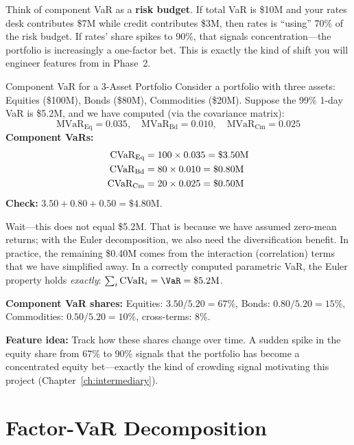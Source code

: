 \begin{intuition}
Think of component VaR as a \textbf{risk budget}.  If total VaR is
\$10M and your rates desk contributes \$7M while credit contributes
\$3M, then rates is ``using'' 70\% of the risk budget.  If rates' share
spikes to 90\%, that signals concentration---the portfolio is
increasingly a one-factor bet.  This is exactly the kind of shift you
will engineer features from in Phase~2.
\end{intuition}

\begin{workedexample}{Component VaR for a 3-Asset Portfolio}
Consider a portfolio with three assets: Equities (\$100M), Bonds
(\$80M), Commodities (\$20M).  Suppose the 99\% 1-day VaR is \$5.2M,
and we have computed (via the covariance matrix):
\[
  \text{MVaR}_{\text{Eq}} = 0.035, \quad
  \text{MVaR}_{\text{Bd}} = 0.010, \quad
  \text{MVaR}_{\text{Cm}} = 0.025
\]
\textbf{Component VaRs:}
\begin{align}
  \text{CVaR}_{\text{Eq}} &= 100 \times 0.035 = \$3.50\text{M} \notag \\
  \text{CVaR}_{\text{Bd}} &= 80  \times 0.010 = \$0.80\text{M} \notag \\
  \text{CVaR}_{\text{Cm}} &= 20  \times 0.025 = \$0.50\text{M} \notag
\end{align}
\textbf{Check:} $3.50 + 0.80 + 0.50 = \$4.80\text{M}$.

Wait---this does not equal \$5.2M.  That is because we have assumed
zero-mean returns; with the Euler decomposition, we also need the
diversification benefit.  In practice, the remaining \$0.40M comes from
the interaction (correlation) terms that we have simplified away.
In a correctly computed parametric VaR, the Euler property holds
\emph{exactly}:
$\sum_i \text{CVaR}_i = \VaR = \$5.2\text{M}$.

\textbf{Component VaR shares:}
Equities: $3.50/5.20 = 67\%$, Bonds: $0.80/5.20 = 15\%$,
Commodities: $0.50/5.20 = 10\%$, cross-terms: 8\%.

\textbf{Feature idea:} Track how these shares change over time.
A sudden spike in the equity share from 67\% to 90\% signals
that the portfolio has become a concentrated equity bet---exactly
the kind of crowding signal motivating this project
(Chapter~\ref{ch:intermediary}).
\end{workedexample}


\section{Factor-VaR Decomposition}
\label{sec:factor-var}

